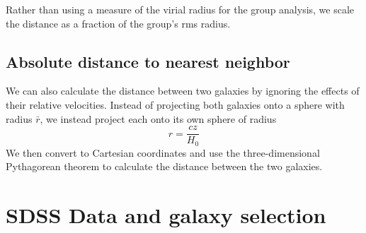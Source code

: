 Rather than using a measure of the virial radius for the group analysis, we 
scale the distance as a fraction of the group's rms radius.


\subsection{Absolute distance to nearest neighbor}

We can also calculate the distance between two galaxies by ignoring the effects 
of their relative velocities.  Instead of projecting both galaxies onto a sphere 
with radius $\bar{r}$, we instead project each onto its own sphere of radius 
\begin{equation}
    r = \frac{cz}{H_0}
\end{equation}
We then convert to Cartesian coordinates and use the three-dimensional 
Pythagorean theorem to calculate the distance between the two galaxies.




\section[Data]{SDSS Data and galaxy selection}

